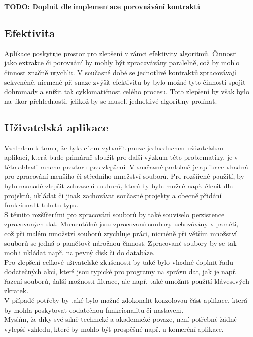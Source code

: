 			\textbf{\textcolor{pblue}{TODO: Doplnit dle implementace porovnávání kontraktů}}
  		
  		\subsection{Efektivita}
	  		Aplikace poskytuje prostor pro zlepšení v rámci efektivity algoritmů. Činnosti jako extrakce či porovnání by mohly být zpracovávány paralelně, což by mohlo činnost značně urychlit. V současné době se jednotlivé kontraktů zpracovávají sekvenčně, nicméně při snaze zvýšit efektivitu by bylo možné tyto činnosti spojit dohromady a snížit tak cyklomatičnost celého procesu. Toto zlepšení by však bylo na úkor přehlednosti, jelikož by se museli jednotlivé algoritmy prolínat.\\
  		
  		\subsection{Uživatelská aplikace}
  			Vzhledem k tomu, že bylo cílem vytvořit pouze jednoduchou uživatelskou aplikaci, která bude primárně sloužit pro další výzkum této problematiky, je v této oblasti mnoho prostoru pro zlepšení. V současné podobně je aplikace vhodná pro zpracování menšího či středního množství souborů. Pro rozšířené použití, by bylo nasnadě zlepšit zobrazení souborů, které by bylo možné např. členit dle projektů, ukládat či jinak zachovávat současné projekty a obecně přidání funkcionalit tohoto typu.\\ 
  			
  			S těmito rozšířeními pro zpracování souborů by také souviselo perzistence zpracovaných dat. Momentálně jsou zpracované soubory uchovávány v paměti, což při malém množství souborů zrychluje práci, nicméně při větším množství souborů se jedná o paměťově náročnou činnost. Zpracované soubory by se tak mohli ukládat např. na pevný disk či do databáze.\\
  			
  			Pro zlepšení celkové uživatelské zkušenosti by také bylo vhodné doplnit řadu dodatečných akcí, které jsou typické pro programy na správu dat, jak je např. řazení souborů, další možnosti filtrace, ale např. také umožnit použití klávesových zkratek.\\
  			
  			V případě potřeby by také bylo možné zdokonalit konzolovou část aplikace, která by mohla poskytovat dodatečnou funkcionalitu či nastavení.\\
  			
  			Myslím, že díky své silně technické a akademické povaze, není potřebné žádné vylepší vzhledu, které by mohlo být prospěšné např. u komerční aplikace.